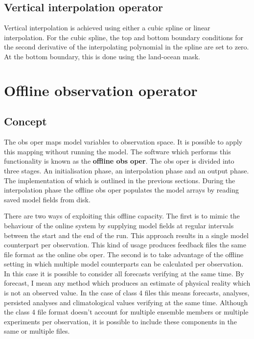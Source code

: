 \documentclass[../main/NEMO_manual]{subfiles}
\begin{document}
\subsection{Vertical interpolation operator}

Vertical interpolation is achieved using either a cubic spline or linear interpolation.
For the cubic spline, the top and bottom boundary conditions for the second derivative of
the interpolating polynomial in the spline are set to zero.
At the bottom boundary, this is done using the land-ocean mask.

\newpage



\section{Offline observation operator}
\label{sec:OBS_ooo}

\subsection{Concept}

The obs oper maps model variables to observation space.
It is possible to apply this mapping without running the model.
The software which performs this functionality is known as the \textbf{offline obs oper}.
The obs oper is divided into three stages.
An initialisation phase, an interpolation phase and an output phase.
The implementation of which is outlined in the previous sections.
During the interpolation phase the offline obs oper populates the model arrays by
reading saved model fields from disk.

There are two ways of exploiting this offline capacity.
The first is to mimic the behaviour of the online system by supplying model fields at
regular intervals between the start and the end of the run.
This approach results in a single model counterpart per observation.
This kind of usage produces feedback files the same file format as the online obs oper.
The second is to take advantage of the offline setting in which
multiple model counterparts can be calculated per observation.
In this case it is possible to consider all forecasts verifying at the same time.
By forecast, I mean any method which produces an estimate of physical reality which is not an observed value.
In the case of class 4 files this means forecasts, analyses, persisted analyses and
climatological values verifying at the same time.
Although the class 4 file format doesn't account for multiple ensemble members or
multiple experiments per observation, it is possible to include these components in the same or multiple files.
\end{document}
